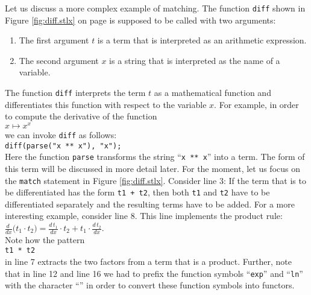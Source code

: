 Let us discuss a more complex example of matching.  The function \texttt{diff} shown in Figure
\ref{fig:diff.stlx} on page \pageref{fig:diff.stlx} is supposed to be called with two arguments:
\begin{enumerate}
\item The first argument $t$ is a term that is interpreted as an arithmetic expression.
\item The second argument $x$ is a string that is interpreted as  the name of a variable.
\end{enumerate}
The function \texttt{diff} interprets the term $t$ as a mathematical function and differentiates this
function with respect to the variable $x$.  For example, in order to compute the derivative of the function
\\[0.2cm]
\hspace*{1.3cm}
$x \mapsto x^x$
\\[0.2cm]
we can invoke \texttt{diff} as follows:
\\[0.2cm]
\hspace*{1.3cm}
\texttt{diff(parse("x ** x"), "x");}
\\[0.2cm]
Here the function \texttt{parse} transforms the string ``\texttt{x ** x}'' into a term.  The form of
this term will be discussed in more detail later.  For the moment, let us focus on the
\texttt{match} statement in Figure
\ref{fig:diff.stlx}.  Consider line 3: If the term that is to be differentiated has the form
\texttt{t1 + t2}, then both \texttt{t1} and \texttt{t2} have to be differentiated separately and the
resulting terms have to be added.  For a more interesting example, consider line 8.  This line
implements the product rule:
\\[0.2cm]
\hspace*{1.3cm}
$\frac{d\;}{dx} \bigl(t_1 \cdot t_2\bigr) = \frac{d\, t_1}{dx} \cdot t_2 + t_1 \cdot \frac{d\,t_2}{dx}$.
\\[0.2cm]
Note how the pattern 
\\[0.2cm]
\hspace*{1.3cm}
\texttt{t1 * t2}
\\[0.2cm]
in line 7 extracts the two factors from a term that is a product.  Further, note that in line 12 and line 16
we had to prefix the function symbols ``\texttt{exp}'' and ``\texttt{ln}'' with the character
``\texttt{}'' in order to convert these function symbols into functors.

